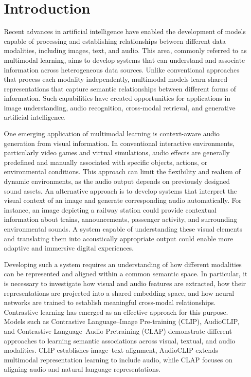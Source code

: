 \documentclass[pdflatex,sn-mathphys-num]{sn-jnl}%
\theoremstyle{thmstyleone}%
\theoremstyle{thmstyletwo}%
\theoremstyle{thmstylethree}%
\begin{document}
\section{Introduction}\label{sec1}

Recent advances in artificial intelligence have enabled the development of models capable of processing and establishing relationships between different data modalities, including images, text, and audio. This area, commonly referred to as multimodal learning, aims to develop systems that can understand and associate information across heterogeneous data sources. Unlike conventional approaches that process each modality independently, multimodal models learn shared representations that capture semantic relationships between different forms of information. Such capabilities have created opportunities for applications in image understanding, audio recognition, cross-modal retrieval, and generative artificial intelligence.

One emerging application of multimodal learning is context-aware audio generation from visual information. In conventional interactive environments, particularly video games and virtual simulations, audio effects are generally predefined and manually associated with specific objects, actions, or environmental conditions. This approach can limit the flexibility and realism of dynamic environments, as the audio output depends on previously designed sound assets. An alternative approach is to develop systems that interpret the visual context of an image and generate corresponding audio automatically. For instance, an image depicting a railway station could provide contextual information about trains, announcements, passenger activity, and surrounding environmental sounds. A system capable of understanding these visual elements and translating them into acoustically appropriate output could enable more adaptive and immersive digital experiences.

Developing such a system requires an understanding of how different modalities can be represented and aligned within a common semantic space. In particular, it is necessary to investigate how visual and audio features are extracted, how their representations are projected into a shared embedding space, and how neural networks are trained to establish meaningful cross-modal relationships. Contrastive learning has emerged as an effective approach for this purpose. Models such as Contrastive Language--Image Pre-training (CLIP), AudioCLIP, and Contrastive Language--Audio Pretraining (CLAP) demonstrate different approaches to learning semantic associations across visual, textual, and audio modalities. CLIP establishes image--text alignment, AudioCLIP extends multimodal representation learning to include audio, while CLAP focuses on aligning audio and natural language representations.
\end{document}
